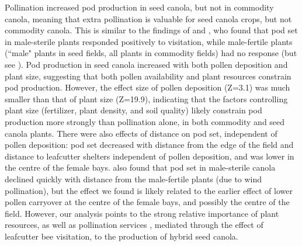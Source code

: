 \documentclass[12pt]{article} %
\begin{document}
Pollination increased pod production in seed canola, but not in commodity canola, meaning that extra pollination is valuable for seed canola crops, but not commodity canola. 
This is similar to the findings of \citet{mesquida1981} and \citet{steffan2003}, who found that pod set in male-sterile plants responded positively to visitation, while male-fertile plants (``male" plants in seed fields, all plants in commodity fields) had no response (but see \citealp{adegas1992}).
Pod production in seed canola increased with both pollen deposition and plant size, suggesting that both pollen availability and plant resources constrain pod production. %
However, the effect size of pollen deposition (Z=3.1) was much smaller than that of plant size (Z=19.9), indicating that the factors controlling plant size (fertilizer, plant density, and soil quality) likely constrain pod production more strongly than pollination alone, in both commodity and seed canola plants. %
There were also effects of distance on pod set, independent of pollen deposition: pod set decreased with distance from the edge of the field and distance to leafcutter shelters independent of pollen deposition, and was lower in the centre of the female bays.
\citet{mesquida1978} also found that pod set in male-sterile canola declined quickly with distance from the male-fertile plants (due to wind pollination), but the effect we found is likely related to the earlier effect of lower pollen carryover at the centre of the female bays, and possibly the centre of the field.
However, our analysis points to the strong relative importance of plant resources, as well as pollination services \citep{marini2015}, mediated through the effect of leafcutter bee visitation, to the production of hybrid seed canola. 
\end{document}
